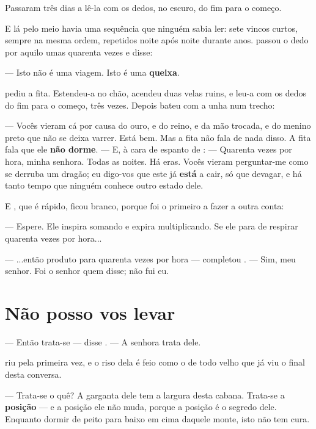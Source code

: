 \documentclass[livro.tex]{subfiles}
\begin{document}
Passaram três dias a lê-la com os dedos, no escuro, do fim para o começo.

\medskip

E lá pelo meio havia uma sequência que ninguém sabia ler: sete vincos curtos, sempre na mesma
ordem, repetidos noite após noite durante anos. \Drk passou o dedo por aquilo umas quarenta vezes
e disse:

--- Isto não é uma viagem. Isto é uma \textbf{queixa}.

\Qui pediu a fita. Estendeu-a no chão, acendeu duas velas ruins, e leu-a com os dedos do fim para
o começo, três vezes. Depois bateu com a unha num trecho:

--- Vocês vieram cá por causa do ouro, e do reino, e da mão trocada, e do menino preto que não se
deixa varrer. Está bem. Mas a fita não fala de nada disso. A fita fala que ele \textbf{não
dorme}. --- E, à cara de espanto de \Yas : --- Quarenta vezes por hora, minha senhora. Todas as
noites. Há eras. Vocês vieram perguntar-me como se derruba um dragão; eu digo-vos que este já
\textbf{está} a cair, só que devagar, e há tanto tempo que ninguém conhece outro estado dele.

\medskip

E \Joa , que é rápido, ficou branco, porque foi o primeiro a fazer a outra conta:

--- Espere. Ele inspira somando e expira multiplicando. Se ele para de respirar quarenta vezes
por hora...

--- ...então produto para quarenta vezes por hora --- completou \Qui . --- Sim, meu senhor. Foi
o senhor quem disse; não fui eu.

\chapter{Não posso vos levar}

--- Então trata-se --- disse \Yas . --- A senhora trata dele.

\Qui riu pela primeira vez, e o riso dela é feio como o de todo velho que já viu o final desta
conversa.

--- Trata-se o quê? A garganta dele tem a largura desta cabana. Trata-se a \textbf{posição} --- e
a posição ele não muda, porque a posição é o segredo dele. Enquanto dormir de peito para baixo em
cima daquele monte, isto não tem cura.
\end{document}
